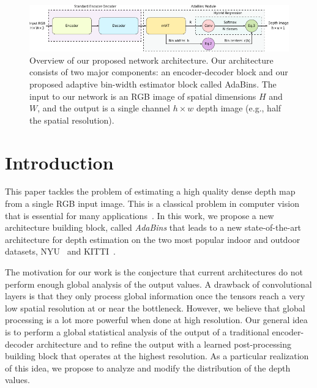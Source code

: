 \documentclass[final]{cvpr}
\begin{document}
\begin{figure}[t]
\centering
   \includegraphics[width=\linewidth]{figure_overview_v4_compact.pdf}
   \caption{Overview of our proposed network architecture. Our architecture consists of two major components: an encoder-decoder block and our proposed adaptive bin-width estimator block called AdaBins. The input to our network is an RGB image of spatial dimensions $H$ and $W$, and the output is a single channel $h \times w$ depth image (e.g., half the spatial resolution).}
\label{fig:arch}
\end{figure}


\section{Introduction}

This paper tackles the problem of estimating a high quality dense depth map from a single RGB input image. This is a classical problem in computer vision that is essential for many applications~\cite{Lee2011,moreno2007active,Hazirbas2016FuseNetID,DepthLab2020}.
%
In this work, we propose a new architecture building block, called \emph{AdaBins} that leads to a new state-of-the-art architecture for depth estimation on the two most popular indoor and outdoor datasets, NYU~\cite{Silberman2012} and KITTI~\cite{geiger2013vision}.

The motivation for our work is the conjecture that current architectures do not perform enough global analysis of the output values. A drawback of convolutional layers is that they only process global information once the tensors reach a very low spatial resolution at or near the bottleneck. However, we believe that global processing is a lot more powerful when done at high resolution. Our general idea is to perform a global statistical analysis of the output of a traditional encoder-decoder architecture and to refine the output with a learned post-processing building block that operates at the highest resolution. As a particular realization of this idea, we propose to analyze and modify the distribution of the depth values.
\end{document}
